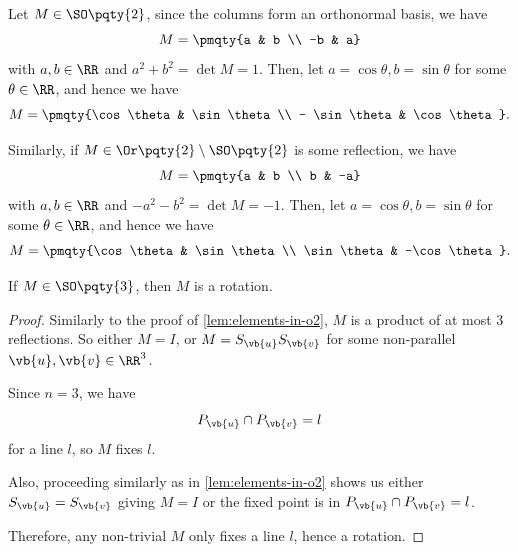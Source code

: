 \begin{remark}
    Let \(M \in \SO\pqty{2}\), since the columns form an orthonormal basis, we have
    \[
        M = \pmqty{a & b \\ -b & a}
    \]
    with \(a, b \in \RR\) and \(a^2 + b^2 = \det M = 1\). Then, let \(a = \cos \theta, b = \sin \theta\) for some \(\theta \in \RR\), and hence we have
    \[
        M = \pmqty{\cos \theta & \sin \theta \\ - \sin \theta & \cos \theta}.
    \]

    Similarly, if \(M \in \Or\pqty{2} \setminus \SO\pqty{2}\) is some reflection, we have
    \[
        M = \pmqty{a & b \\ b & -a}
    \]
    with \(a, b \in \RR\) and \(-a^2 - b^2 = \det M = -1\). Then, let \(a = \cos \theta, b = \sin \theta\) for some \(\theta \in \RR\), and hence we have
    \[
        M = \pmqty{\cos \theta & \sin \theta \\ \sin \theta & -\cos \theta}.
    \]
\end{remark}

\begin{lemma}
    \label{lem:elements-in-so3}%
    If \(M \in \SO\pqty{3}\), then \(M\) is a rotation.
\end{lemma}

\begin{proof}
    Similarly to the proof of \autoref{lem:elements-in-o2}, \(M\) is a product of at most \(3\) reflections. So either \(M = I\), or \(M = S_{\vb{u}} S_{\vb{v}}\) for some non-parallel \(\vb{u}, \vb{v} \in \RR^3\).

    Since \(n = 3\), we have
    \[
        P_{\vb{u}} \cap P_{\vb{v}} = l
    \]
    for a line \(l\), so \(M\) fixes \(l\).

    Also, proceeding similarly as in \autoref{lem:elements-in-o2} shows us either \(S_{\vb{u}} = S_{\vb{v}}\) giving \(M = I\) or the fixed point is in \(P_{\vb{u}} \cap P_{\vb{v}} = l\).

    Therefore, any non-trivial \(M\) only fixes a line \(l\), hence a rotation.
\end{proof}